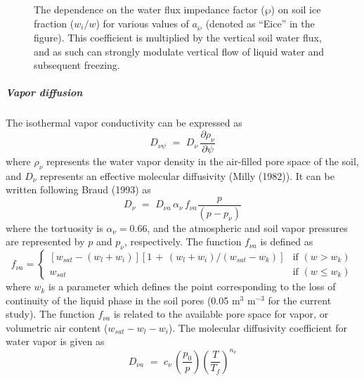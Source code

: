 \begin{figure}[h]
		 \begin{center}
		 \caption{The dependence on the water flux impedance factor ($\wp$)
on soil ice fraction ($w_i/w$) for various
values of $a_\wp$ (denoted as ``Eice'' in the figure). 
This coefficient is multiplied by the
vertical soil water flux, and as such can strongly modulate
vertical flow of liquid water and subsequent
freezing.}
		 \label{iceimped}
		 \end{center}
\end{figure}



\subparagraph{Vapor diffusion}
%
The isothermal vapor conductivity can be expressed as
%
\begin{equation}\label{vapdif}
D_{\nu\psi} \,\,=\,\,
D_\nu \, \frac{\partial\rho_\nu}{\partial\psi}
\end{equation}
%
where $\rho_\nu$ represents the water vapor density in the air-filled pore 
space of the soil, and $D_\nu$ represents an effective molecular
diffusivity (Milly (1982)\nocite{Milly1982}). It can be written following
Braud \etal (1993) as
%
\begin{equation}\label{vapmoldif}
D_\nu \,\,=\,\,
D_{\nu a} \,\alpha_\nu \, f_{\nu a}
\frac{p}{ \left(p-p_\nu\right)}
\end{equation}
%
where the tortuosity is $\alpha_\nu = 0.66$,
and the atmospheric and soil vapor pressures
are represented by $p$ and $p_\nu$, respectively.
The function $f_{\nu a}$ is defined as
%
\[ f_{\nu a} = \left\{ \begin{array}{ll}
\left[w_{sat} - \left(w_l+w_i \right)\right]
\left[1 \,+\, 
{\left(w_l+w_i \right)/
\left(w_{sat}-w_k \right)}
\right]
& \mbox{if $\left(w > w_k\right)$} \\
%
w_{sat} & \mbox{if $\left(w \leq w_k \right)$}
\end{array} 
\right. \] 
%
where $w_k$ is a parameter which defines the point corresponding to
the loss of continuity of the liquid phase in the soil pores 
(0.05 m$^3$ m$^{-3}$ for the current study). The function
$f_{\nu a}$ is related to the available pore space for vapor, or volumetric 
air content ($w_{sat}-w_l-w_i$).
The molecular diffusivity coefficient for water
vapor is given as
%
%
\begin{equation}
\label{moldify}
D_{\nu a} \,\,=\,\,
c_\nu \, \left(\frac{p_0}{ p}\right)
{\left(\frac{T }{ T_f}\right)}^{n_\nu}
\end{equation}
